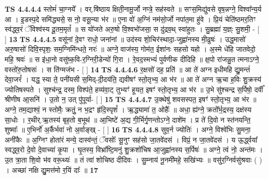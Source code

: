 \documentclass[17pt]{extarticle}
\begin{document}
                  \newline
                                \textbf{ TS 4.4.4.4} \newline
                  स्तोमं॑ चा॒ग्नये᳚ । वर्.षि॑ष्ठाय क्षिती॒नामू॒र्जो नप्त्रे॒ सह॑स्वते ॥ सꣳस॒मिद्यु॑वसे वृष॒न्नग्ने॒ विश्वा᳚न्य॒र्य आ । इ॒डस्प॒दे समि॑द्ध्यसे॒ स नो॒ वसू॒न्या भ॑र ॥ ए॒ना वो॑ अ॒ग्निं नम॑सो॒र्जो नपा॑त॒मा हु॑वे । प्रि॒यं चेति॑ष्ठमर॒तिꣳ स्व॑द्ध्व॒रं ॅविश्व॑स्य दू॒तम॒मृतं᳚ ॥ स यो॑जते अरु॒षो वि॒श्वभो॑जसा॒ स दु॑द्रव॒थ् स्वा॑हुतः । सु॒ब्रह्मा॑ य॒ज्ञ्ः सु॒शमी॒ - [  ] \textbf{  13} \newline
                  \newline
                                \textbf{ TS 4.4.4.5} \newline
                  वसू॑नां दे॒वꣳ राधो॒ जना॑नां ॥ उद॑स्य शो॒चिर॑स्थादा॒-जुह्वा॑नस्य मी॒ढुषः॑ । उद्ध॒मासो॑ अरु॒षासो॑ दिवि॒स्पृशः॒ सम॒ग्निमि॑न्धते॒ नरः॑ ॥ अग्ने॒ वाज॑स्य॒ गोम॑त॒ ईशा॑नः सहसो यहो । अ॒स्मे धे॑हि जातवेदो॒ महि॒ श्रवः॑ ॥ स इ॑धा॒नो वसु॑ष्क॒वि-र॒ग्निरी॒डेन्यो॑ गि॒रा । रे॒वद॒स्मभ्यं॑ पुर्वणीक दीदिहि ॥ क्ष॒पो रा॑जन्नु॒त त्मनाऽग्ने॒ वस्तो॑रु॒तोषसः॑ । स ति॑ग्मजंभ - [  ] \textbf{  14} \newline
                  \newline
                                \textbf{ TS 4.4.4.6} \newline
                  र॒क्षसो॑ दह॒ प्रति॑ ॥ आ ते॑ अग्न इधीमहि द्यु॒मन्तं॑ देवा॒जरं᳚ । यद्ध॒ स्या ते॒ पनी॑यसी स॒मिद्-दी॒दय॑ति॒ द्यवीषꣳ॑ स्तो॒तृभ्य॒ आ भ॑र ॥ आ ते॑ अग्न ऋ॒चा ह॒विः शु॒क्रस्य॑ ज्योतिषस्पते । सुश्च॑न्द्र॒ दस्म॒ विश्प॑ते॒ हव्य॑वा॒ट् तुभ्यꣳ॑ हूयत॒ इषꣳ॑ स्तो॒तृभ्य॒ आ भ॑र ॥ उ॒भे सु॑श्चन्द्र स॒र्पिषो॒ दर्वी᳚ श्रीणीष आ॒सनि॑ । उ॒तो न॒ उत् पु॑पूर्या- [  ] \textbf{  15} \newline
                  \newline
                                \textbf{ TS 4.4.4.7} \newline
                  उ॒क्थेषु॑ शवसस्पत॒ इषꣳ॑ स्तो॒तृभ्य॒ आ भ॑र ॥ अग्ने॒ तम॒द्याश्वं॒ न स्तोमैः॒ क्रतुं॒ न भ॒द्रꣳ हृ॑दि॒स्पृशं᳚ । ऋ॒द्ध्यामा॑ त॒ ओहैः᳚ ॥ अधा॒ ह्य॑ग्ने॒ क्रतो᳚र्भ॒द्रस्य॒ दक्ष॑स्य सा॒धोः । र॒थीर्.ऋ॒तस्य॑ बृह॒तो ब॒भूथ॑ ॥ आ॒भिष्टे॑ अ॒द्य गी॒र्भिर्गृ॒णन्तोऽग्ने॒ दाशे॑म । प्र ते॑ दि॒वो न स्त॑नयन्ति॒ शुष्माः᳚ ॥ ए॒भिर्नो॑ अ॒र्कैर्भवा॑ नो अ॒र्वाङ्ख् - [  ] \textbf{  16} \newline
                  \newline
                                \textbf{ TS 4.4.4.8} \newline
                  सुव॒र्न ज्योतिः॑ । अग्ने॒ विश्वे॑भिः सु॒मना॒ अनी॑कैः ॥ अ॒ग्निꣳ होता॑रं मन्ये॒ दास्व॑न्तं॒ ॅवसोः᳚ सू॒नुꣳ सह॑सो जा॒तवे॑दसं । विप्रं॒ न जा॒तवे॑दसं । य ऊ॒र्द्ध्वया᳚ स्वद्ध्व॒रो दे॒वो दे॒वाच्या॑ कृ॒पा । घृ॒तस्य॒ विभ्रा᳚ष्टि॒मनु॑ शु॒क्रशो॑चिष आ॒जुह्वा॑नस्य स॒र्पिषः॑ ॥ अग्ने॒ त्वं नो॒ अन्त॑मः । उ॒त त्रा॒ता शि॒वो भ॑व वरू॒थ्यः॑ ॥ तं त्वा॑ शोचिष्ठ दीदिवः । सु॒म्नाय॑ नू॒नमी॑महे॒ सखि॑भ्यः ॥ वसु॑र॒ग्निर्वसु॑श्रवाः ( ) । अच्छा॑ नक्षि द्यु॒मत्त॑मो र॒यिं दाः᳚ ॥ \textbf{  17} \newline
\end{document}
